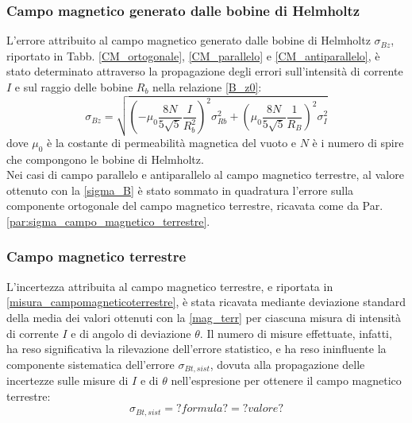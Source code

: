 \documentclass[]{article}
\begin{document}
    \subsubsection{Campo magnetico generato dalle bobine di Helmholtz}
    L'errore attribuito al campo magnetico generato dalle bobine di Helmholtz $\sigma _{Bz} $, riportato in Tabb. \ref{CM_ortogonale}, \ref{CM_parallelo} e \ref{CM_antiparallelo}, è stato determinato attraverso la propagazione degli errori sull'intensità di corrente $I$ e sul raggio delle bobine $R_b$ nella relazione \ref{B_z0}:
    \begin{equation}
        \label{sigma_B}
        \sigma _{Bz} = \sqrt{\left(- \mu _0 \frac{8 N}{5\sqrt{5}} \frac{I}{R_b^2}\right)^2 \sigma_{Rb}^2 + \left(\mu _0 \frac{8 N}{5\sqrt{5}} \frac{1}{R_B} \right)^2 \sigma _I ^2} 
    \end{equation}
    dove $\mu _0 $ è la costante di permeabilità magnetica del vuoto e $N$ è i numero di spire che compongono le bobine di Helmholtz. \\
    Nei casi di campo parallelo e antiparallelo al campo magnetico terrestre, al valore ottenuto con la \ref{sigma_B} è stato sommato in quadratura l'errore sulla componente ortogonale del campo magnetico terrestre, ricavata come da Par. \ref{par:sigma_campo_magnetico_terrestre}.


    \subsubsection{Campo magnetico terrestre}
    L'incertezza attribuita al campo magnetico terrestre, e riportata in \ref{misura_campomagneticoterrestre}, è stata ricavata mediante deviazione standard della media dei valori ottenuti con la \ref{mag_terr} per ciascuna misura di intensità di corrente $I$ e di angolo di deviazione $\theta$. Il numero di misure effettuate, infatti, ha reso significativa la rilevazione dell'errore statistico, e ha reso ininfluente la componente sistematica dell'errore $\sigma _{Bt, sist}$, dovuta alla propagazione delle incertezze sulle misure di $I$ e di $\theta$ nell'espresione per ottenere il campo magnetico terrestre:
    \begin{equation}
        \label{sigma_Bt_stat}
        \sigma _{Bt, sist} = ? formula ? = ? valore ? 
    \end{equation}

    \label{par:sigma_campo_magnetico_terrestre}
\end{document}
